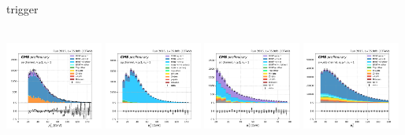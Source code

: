 \begin{frame}{}
    \begin{block}{\smaller \Pe trigger}
    \begin{center}
        \cee \qquad\qquad\qquad\quad \cem \qquad\qquad\qquad\quad \cet \qquad\qquad\qquad\quad \ceh \\
        \includegraphics[width=0.24\textwidth]{chapters/Analysis/sectionPlots/figures/kinematics_pickles/ee/1b/ee_1b_lepton2_pt.pdf}
        \includegraphics[width=0.24\textwidth]{chapters/Analysis/sectionPlots/figures/kinematics_pickles/emu2/1b/emu2_1b_lepton1_pt.pdf}
        \includegraphics[width=0.24\textwidth]{chapters/Analysis/sectionPlots/figures/kinematics_pickles/etau/1b/etau_1b_lepton2_pt.pdf}
        \includegraphics[width=0.24\textwidth]{chapters/Analysis/sectionPlots/figures/kinematics_pickles/e4j/1b/e4j_1b_lepton1_pt.pdf}
    \end{center}
    \end{block}
    
\end{frame}




